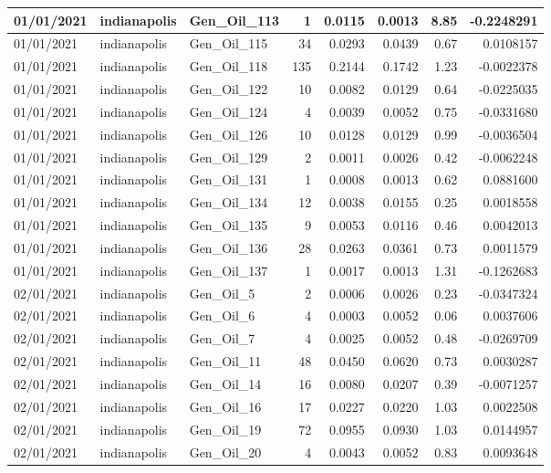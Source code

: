 \documentclass[
  letterpaper,
  DIV=11,
  numbers=noendperiod]{scrartcl}
\begin{document}
\begin{tabular}{l|l|l|r|r|r|r|r}
\hline
01/01/2021 & indianapolis & Gen\_Oil\_113 & 1 & 0.0115 & 0.0013 & 8.85 & -0.2248291\\
\hline
01/01/2021 & indianapolis & Gen\_Oil\_115 & 34 & 0.0293 & 0.0439 & 0.67 & 0.0108157\\
\hline
01/01/2021 & indianapolis & Gen\_Oil\_118 & 135 & 0.2144 & 0.1742 & 1.23 & -0.0022378\\
\hline
01/01/2021 & indianapolis & Gen\_Oil\_122 & 10 & 0.0082 & 0.0129 & 0.64 & -0.0225035\\
\hline
01/01/2021 & indianapolis & Gen\_Oil\_124 & 4 & 0.0039 & 0.0052 & 0.75 & -0.0331680\\
\hline
01/01/2021 & indianapolis & Gen\_Oil\_126 & 10 & 0.0128 & 0.0129 & 0.99 & -0.0036504\\
\hline
01/01/2021 & indianapolis & Gen\_Oil\_129 & 2 & 0.0011 & 0.0026 & 0.42 & -0.0062248\\
\hline
01/01/2021 & indianapolis & Gen\_Oil\_131 & 1 & 0.0008 & 0.0013 & 0.62 & 0.0881600\\
\hline
01/01/2021 & indianapolis & Gen\_Oil\_134 & 12 & 0.0038 & 0.0155 & 0.25 & 0.0018558\\
\hline
01/01/2021 & indianapolis & Gen\_Oil\_135 & 9 & 0.0053 & 0.0116 & 0.46 & 0.0042013\\
\hline
01/01/2021 & indianapolis & Gen\_Oil\_136 & 28 & 0.0263 & 0.0361 & 0.73 & 0.0011579\\
\hline
01/01/2021 & indianapolis & Gen\_Oil\_137 & 1 & 0.0017 & 0.0013 & 1.31 & -0.1262683\\
\hline
02/01/2021 & indianapolis & Gen\_Oil\_5 & 2 & 0.0006 & 0.0026 & 0.23 & -0.0347324\\
\hline
02/01/2021 & indianapolis & Gen\_Oil\_6 & 4 & 0.0003 & 0.0052 & 0.06 & 0.0037606\\
\hline
02/01/2021 & indianapolis & Gen\_Oil\_7 & 4 & 0.0025 & 0.0052 & 0.48 & -0.0269709\\
\hline
02/01/2021 & indianapolis & Gen\_Oil\_11 & 48 & 0.0450 & 0.0620 & 0.73 & 0.0030287\\
\hline
02/01/2021 & indianapolis & Gen\_Oil\_14 & 16 & 0.0080 & 0.0207 & 0.39 & -0.0071257\\
\hline
02/01/2021 & indianapolis & Gen\_Oil\_16 & 17 & 0.0227 & 0.0220 & 1.03 & 0.0022508\\
\hline
02/01/2021 & indianapolis & Gen\_Oil\_19 & 72 & 0.0955 & 0.0930 & 1.03 & 0.0144957\\
\hline
02/01/2021 & indianapolis & Gen\_Oil\_20 & 4 & 0.0043 & 0.0052 & 0.83 & 0.0093648\\

\end{tabular}
\end{document}
